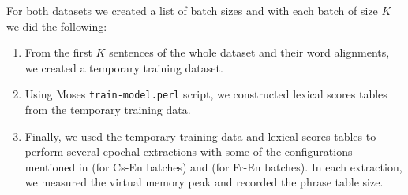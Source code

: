 For both datasets we created a list of batch sizes and with each batch of size $K$ we did the following:
\begin{enumerate}
  \item From the first $K$ sentences of the whole dataset and their word alignments, we
    created a temporary training dataset.
  \item Using Moses \texttt{train-model.perl} script, we constructed lexical scores tables
    from the temporary training data.
  \item Finally, we used the temporary training data and lexical scores tables to perform several epochal
    extractions with some of the configurations mentioned in
     (for Cs-En batches) and  (for Fr-En batches).
    In each extraction, we measured the virtual memory peak and recorded the phrase table size.
\end{enumerate}
